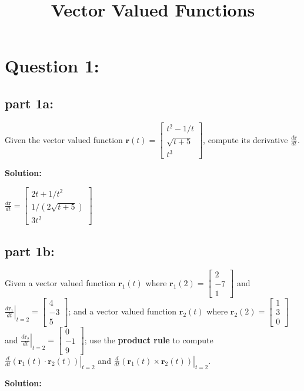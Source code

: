 \documentclass{article}
\title{Vector Valued Functions}
\date{}
\newcommand{\colvec}[3]{\begin{bmatrix} #1 \\ #2 \\ #3 \end{bmatrix}}
\newcommand{\at}[1]{\left. #1 \right|}
\newcommand{\dr}[1]{\textcolor{dark_red}{#1}}
\begin{document}
\maketitle

\section*{Question 1:}

\subsection*{part 1a:}

Given the vector valued function \(\mathbf{r}(t) = \colvec{t^2 - 1/t}{\sqrt{t + 5}}{t^3}\), compute its derivative \(\frac{d\mathbf{r}}{dt}\).

\vspace{0.5cm}

\dr{\bf Solution:}

\vspace{0.5cm}

\dr{\(\frac{d\mathbf{r}}{dt} = \colvec{2t + 1/t^2}{1/(2\sqrt{t + 5})}{3t^2}\)}

\vspace{0.5cm}



\subsection*{part 1b:}

Given a vector valued function \(\mathbf{r}_1(t)\) where \(\mathbf{r}_1(2) = \colvec{2}{-7}{1}\) and \(\at{\frac{d\mathbf{r}_1}{dt}}_{t = 2} = \colvec{4}{-3}{5}\); and a vector valued function \(\mathbf{r}_2(t)\) where \(\mathbf{r}_2(2) = \colvec{1}{3}{0}\) and \(\at{\frac{d\mathbf{r}_2}{dt}}_{t = 2} = \colvec{0}{-1}{9}\); use the {\bf product rule} to compute \(\at{\frac{d}{dt}(\mathbf{r}_1(t) \cdot \mathbf{r}_2(t))}_{t = 2}\) and \(\at{\frac{d}{dt}(\mathbf{r}_1(t) \times \mathbf{r}_2(t))}_{t = 2}\). 

\vspace{0.5cm}

\dr{\bf Solution:}

\vspace{-0.5cm}
\end{document}
